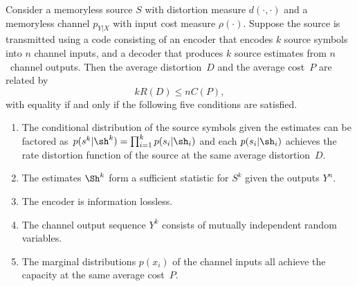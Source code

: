 \begin{theorem}
  \label{thm:feedbackconv}
  Consider a memoryless source $S$ with distortion measure $d(\cdot,\cdot)$ and
  a memoryless channel $p_{Y|X}$ with input cost measure $\rho(\cdot)$. Suppose
  the source is transmitted using a code consisting of an encoder that encodes
  $k$ source symbols into $n$ channel inputs, and a decoder that produces $k$
  source estimates from $n$~channel outputs. Then the average distortion~$D$ and
  the average cost~$P$ are related by
  \begin{equation}
    \label{eq:shannonlimit}
    kR(D) \le nC(P),
  \end{equation}
  with equality if and only if the following five conditions are satisfied.
  \begin{enumerate}
    \item The conditional distribution of the source symbols given the estimates
      can be factored as~$p(s^k|\sh^k) = \prod_{i=1}^k p(s_i|\sh_i)$ and each
      $p(s_i|\sh_i)$ achieves the rate distortion function of the source at the
      same average distortion~$D$. 
    \item The estimates $\Sh^k$ form a sufficient statistic for $S^k$ given the
      outputs $Y^n$. 
    \item The encoder is information lossless.
    \item The channel output sequence $Y^k$ consists of mutually independent
      random variables. 
    \item The marginal distributions $p(x_i)$ of the channel inputs all achieve
      the capacity at the same average cost~$P$.
  \end{enumerate}
\end{theorem}

